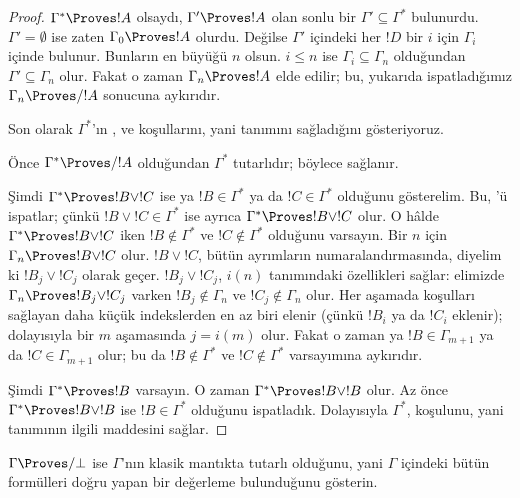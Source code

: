 \begin{proof}
  $\Gamma^*\Proves !A$ olsaydı, $\Gamma'\Proves !A$ olan sonlu bir
  $\Gamma'\subseteq\Gamma^*$ bulunurdu. $\Gamma'=\emptyset$ ise zaten
  $\Gamma_0\Proves !A$ olurdu. Değilse $\Gamma'$ içindeki her $!D$ bir
  $i$ için $\Gamma_i$ içinde bulunur. Bunların en büyüğü $n$ olsun.
  $i\leq n$ ise $\Gamma_i\subseteq\Gamma_n$ olduğundan
  $\Gamma'\subseteq\Gamma_n$ olur. Fakat o zaman
  $\Gamma_n\Proves !A$ elde edilir; bu, yukarıda ispatladığımız
  $\Gamma_n\Proves/ !A$ sonucuna aykırıdır.

  Son olarak $\Gamma^*$'ın ,  ve
   koşullarını, yani  tanımını
  sağladığını gösteriyoruz.

  Önce $\Gamma^*\Proves/ !A$ olduğundan $\Gamma^*$ tutarlıdır; böylece
   sağlanır.

  Şimdi $\Gamma^*\Proves !B\lor !C$ ise ya $!B\in\Gamma^*$ ya da
  $!C\in\Gamma^*$ olduğunu gösterelim. Bu, 'ü
  ispatlar; çünkü $!B\lor !C\in\Gamma^*$ ise ayrıca
  $\Gamma^*\Proves !B\lor !C$ olur. O hâlde
  $\Gamma^*\Proves !B\lor !C$ iken $!B\notin\Gamma^*$ ve
  $!C\notin\Gamma^*$ olduğunu varsayın. Bir $n$ için
  $\Gamma_n\Proves !B\lor !C$ olur. $!B\lor !C$, bütün ayrımların
  numaralandırmasında, diyelim ki $!B_j\lor !C_j$ olarak geçer.
  $!B_j\lor !C_j$, $i(n)$ tanımındaki özellikleri sağlar: elimizde
  $\Gamma_n\Proves !B_j\lor !C_j$ varken $!B_j\notin\Gamma_n$ ve
  $!C_j\notin\Gamma_n$ olur. Her aşamada koşulları sağlayan daha küçük
  indekslerden en az biri elenir (çünkü $!B_i$ ya da $!C_i$ eklenir);
  dolayısıyla bir $m$ aşamasında $j=i(m)$ olur. Fakat o zaman ya
  $!B\in\Gamma_{m+1}$ ya da $!C\in\Gamma_{m+1}$ olur; bu da
  $!B\notin\Gamma^*$ ve $!C\notin\Gamma^*$ varsayımına aykırıdır.

  Şimdi $\Gamma^*\Proves !B$ varsayın. O zaman
  $\Gamma^*\Proves !B\lor !B$ olur. Az önce
  $\Gamma^*\Proves !B\lor !B$ ise $!B\in\Gamma^*$ olduğunu ispatladık.
  Dolayısıyla $\Gamma^*$,  koşulunu, yani
   tanımının ilgili maddesini sağlar.
\end{proof}

\begin{prob}
$\Gamma\Proves/\bot$ ise $\Gamma$'nın klasik mantıkta tutarlı olduğunu,
yani $\Gamma$ içindeki bütün formülleri doğru yapan bir değerleme bulunduğunu
gösterin.
\end{prob}

